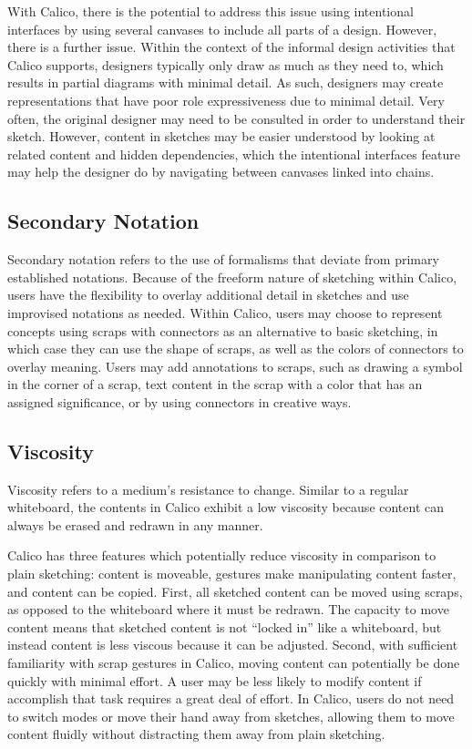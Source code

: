 With Calico, there is the potential to address this issue using intentional interfaces by using several canvases to include all parts of a design. However, there is a further issue. Within the context of the informal design activities that Calico supports, designers typically only draw as much as they need to, which results in partial diagrams with minimal detail. As such, designers may create representations that have poor role expressiveness due to minimal detail. Very often, the original designer may need to be consulted in order to understand their sketch. However, content in sketches may be easier understood by looking at related content and hidden dependencies, which the intentional interfaces feature may help the designer do by navigating between canvases linked into chains. 


\subsection{Secondary Notation}

Secondary notation refers to the use of formalisms that deviate from primary established notations. Because of the freeform nature of sketching within Calico, users have the flexibility to overlay additional detail in sketches and use improvised notations as needed. Within Calico, users may choose to represent concepts using scraps with connectors as an alternative to basic sketching, in which case they can use the shape of scraps, as well as the colors of connectors to overlay meaning. Users may add annotations to scraps, such as drawing a symbol in the corner of a scrap, text content in the scrap with a color that has an assigned significance, or by using connectors in creative ways.


\subsection{Viscosity}

Viscosity refers to a medium's resistance to change. Similar to a regular whiteboard, the contents in Calico exhibit a low viscosity because content can always be erased and redrawn in any manner. 

Calico has three features which potentially reduce viscosity in comparison to plain sketching: content is moveable, gestures make manipulating content faster, and content can be copied. First, all sketched content can be moved using scraps, as opposed to the whiteboard where it must be redrawn. The capacity to move content means that sketched content is not ``locked in'' like a whiteboard, but instead content is less viscous because it can be adjusted. Second, with sufficient familiarity with scrap gestures in Calico, moving content can potentially be done quickly with minimal effort. A user may be less likely to modify content if accomplish that task requires a great deal of effort. In Calico, users do not need to switch modes or move their hand away from sketches, allowing them to move content fluidly without distracting them away from plain sketching. 



